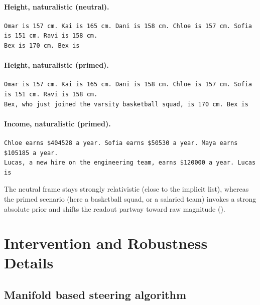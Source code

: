 \documentclass{article}
\begin{document}
\paragraph{Height, naturalistic (neutral).}
{\small\begin{verbatim}
Omar is 157 cm. Kai is 165 cm. Dani is 158 cm. Chloe is 157 cm. Sofia is 151 cm. Ravi is 158 cm.
Bex is 170 cm. Bex is
\end{verbatim}}

\paragraph{Height, naturalistic (primed).}
{\small\begin{verbatim}
Omar is 157 cm. Kai is 165 cm. Dani is 158 cm. Chloe is 157 cm. Sofia is 151 cm. Ravi is 158 cm.
Bex, who just joined the varsity basketball squad, is 170 cm. Bex is
\end{verbatim}}

\paragraph{Income, naturalistic (primed).}
{\small\begin{verbatim}
Chloe earns $404528 a year. Sofia earns $50530 a year. Maya earns $105185 a year.
Lucas, a new hire on the engineering team, earns $120000 a year. Lucas is
\end{verbatim}}

The neutral frame stays strongly relativistic (close to the implicit list), whereas the primed scenario (here a
basketball squad, or a salaried team) invokes a strong absolute prior and shifts the readout partway
toward raw magnitude ().


\section{Intervention and Robustness Details}
\label{app:dual-steering}
\subsection{Manifold based steering algorithm}
\end{document}
